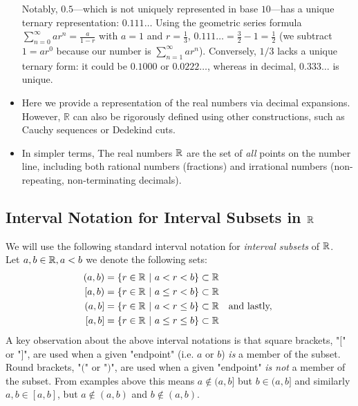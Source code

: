 \begin{itemize}
{    Notably, $0.5$—which is not uniquely represented in base $10$—has a unique ternary representation: $0.111\ldots$ Using the geometric series formula $\sum_{n=0}^\infty ar^n = \frac{a}{1-r}$ with $a=1$ and $r=\frac{1}{3}$, $0.111\ldots = \frac{3}{2} - 1 = \frac{1}{2}$ (we subtract $1=ar^0$ because our number is $\sum_{n=1}^\infty ar^n$). Conversely, $1/3$ lacks a unique 
    ternary form: it could be $0.1000$ or $0.0222\ldots$, whereas in decimal, $0.333\ldots$ is unique.}
    \item Here we provide a representation of the real numbers via decimal expansions. However, \(\mathbb{R}\) can also be rigorously defined using other constructions, such as Cauchy sequences or Dedekind cuts.
    \item In simpler terms, The real numbers ${\mathbb{ R}}$ are the set of \textit{all} points on the number line, including both rational numbers (fractions) and irrational numbers (non-repeating, non-terminating decimals).
\end{itemize}
\subsection{Interval Notation for Interval Subsets in ${\mathbb{ R}}$}
We will use the following standard interval notation for \textit{interval subsets} of ${\mathbb{ R}}$.\\ 
Let $a,b\in {\mathbb{ R}}, a<b$ we denote the following sets:
\begin{align}
    (a,b)&= \{r\in \R \ | \ a<r<b \} \subset \R \nonumber \\
    [a,b)&= \{r\in \R \ | \ a\leq r<b \} \subset \R \nonumber \\
    (a,b]&= \{r\in \R \ | \ a< r\leq b \} \subset \R \quad \text{and lastly, } \nonumber \\
    [a,b]&= \{r\in \R \ | \ a\leq r \leq b \} \subset \R \nonumber
\end{align}
\noindent A key observation about the above interval notations is that square brackets, "$[$" or "$]$", are used when a given "endpoint" (i.e. $a$ or $b$) \textit{is} a member of the subset. Round brackets, "$($" or "$)$", are used when a given "endpoint" \textit{is not} a member of the subset. From examples above this means $a\not \in (a,b]$ but $b\in (a,b]$ and similarly $a,b\in [a,b]$, but $a\not \in (a,b)$ and $b \not \in (a,b)$.

